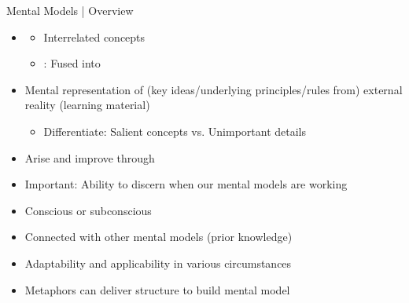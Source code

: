 \documentclass{ercisbeamer}
\begin{document}
\begin{frame}{Mental Models | Overview}
    \begin{tbox}
        \begin{itemize}
            \item {}
            \begin{itemize}
                \item Interrelated concepts 
                \item {}: Fused into 
            \end{itemize}
            \item Mental representation of (key ideas/underlying principles/rules from) external reality (learning material)
            \begin{itemize}
                \item Differentiate: Salient concepts vs. Unimportant details
            \end{itemize}
            \item Arise and improve through 
            \item Important: Ability to discern when our mental models are  working
            \item Conscious or subconscious
            \item Connected with other mental models (prior knowledge)
            \item Adaptability and applicability in various circumstances
            \item Metaphors can deliver structure to build mental model
        \end{itemize}
    \end{tbox}
\end{frame}
\end{document}
